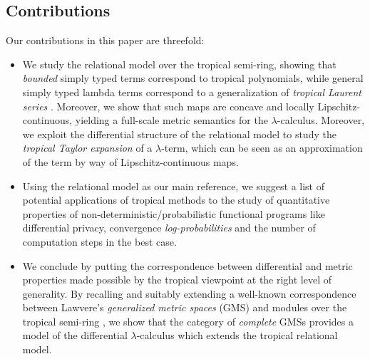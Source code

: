 \subsection{Contributions}

Our contributions in this paper are threefold:
\begin{itemize}

\item We study the relational model over the tropical semi-ring, showing that
\emph{bounded} simply typed terms correspond to tropical polynomials, while general
 simply typed lambda terms correspond to a generalization of \emph{tropical Laurent series} \cite{Porzio2021}. Moreover, we show that such maps are concave and locally Lipschitz-continuous, yielding a full-scale metric semantics for the $\lambda$-calculus.
Moreover, we exploit the differential structure of the relational model to study the \emph{tropical Taylor expansion} of a $\lambda$-term, which can be seen as an approximation of the term by way of Lipschitz-continuous maps.


\item Using the relational model as our main reference, we suggest a list of potential applications of tropical methods to the study of quantitative properties of non-deterministic/probabilistic functional programs like differential privacy, convergence \emph{log-probabilities} and the number of computation steps in the best case.

\item We conclude by putting the correspondence between differential and metric properties made possible by the tropical viewpoint at the right level of generality. 
By recalling and suitably extending a well-known correspondence between Lawvere's \emph{generalized metric spaces} (GMS) \cite{Lawvere1973, Stubbe2014} and modules over the tropical semi-ring \cite{Russo2007}, we show that the category of \emph{complete}  GMSs provides a model of the differential $\lambda$-calculus which extends the tropical relational model.
\end{itemize}
%
%
%
%
%
%
%
%
%


